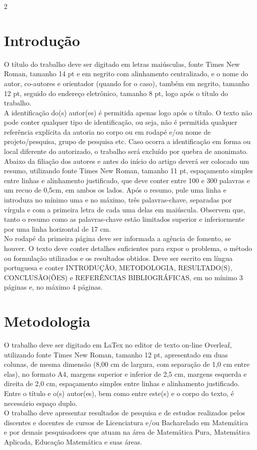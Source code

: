 \documentclass[12pt, a4paper]{article}
\begin{document}
\begin{multicols}{2}

\section{Introdução}
\noindent O título do trabalho deve ser digitado em letras maiúsculas, fonte Times New Roman, tamanho 14 pt e em negrito com alinhamento centralizado, e o nome do autor, co-autores e orientador (quando for o caso), também em negrito, tamanho 12 pt, seguido do endereço eletrônico, tamanho 8 pt, logo após o título do trabalho.
\\ A identificação do(s) autor(es) é permitida apenas logo após o título. O texto não pode conter qualquer tipo de identificação, ou seja, não é permitida qualquer referência explícita da autoria no corpo ou em rodapé e/ou nome de projeto/pesquisa, grupo de pesquisa etc. Caso ocorra a identificação em forma ou local diferente do autorizado, o trabalho será excluído por quebra de anonimato.
\\ Abaixo da filiação dos autores e antes do início do artigo deverá ser colocado um resumo, utilizando fonte Times New Roman, tamanho 11 pt, espaçamento simples entre linhas e alinhamento justificado, que deve conter entre 100 e 300 palavras e um recuo de 0,5cm, em ambos os lados. Após o resumo, pule uma linha e introduza no mínimo uma e no máximo, três palavras-chave, separadas por vírgula e com a primeira letra de cada uma delas em maiúscula. Observem que, tanto o resumo como as palavras-chave estão limitados superior e inferiormente por uma linha horizontal de 17 cm. 
\\No rodapé da primeira página deve ser informada a agência de fomento, se houver.
O texto deve conter detalhes suficientes para expor o problema, o método ou formulação utilizados e os resultados obtidos. Deve ser escrito em língua portuguesa e conter INTRODUÇÃO, METODOLOGIA, RESULTADO(S), CONCLUSÃO(ÕES) e REFERÊNCIAS BIBLIOGRÁFICAS, em no mínimo 3 páginas e, no máximo 4 páginas.

\section{Metodologia}

\noindent O trabalho deve ser digitado em LaTex no editor de texto on-line Overleaf, utilizando fonte Times New Roman, tamanho 12 pt, apresentado em duas colunas, de mesma dimensão (8,00 cm de largura, com separação de 1,0 cm entre elas), no formato A4, margens superior e inferior de 2,5 cm, margens esquerda e direita de 2,0 cm, espaçamento simples entre linhas e alinhamento justificado. Entre o título e o(s) autor(es), bem como entre este(s) e o corpo do texto, é necessário espaço duplo.
\\ O trabalho deve apresentar resultados de pesquisa e de estudos realizados pelos discentes e docentes de cursos de Licenciatura e/ou Bacharelado em Matemática e por demais pesquisadores que atuam na área de Matemática Pura, Matemática Aplicada, Educação Matemática e suas áreas.


\end{multicols}
\end{document}
